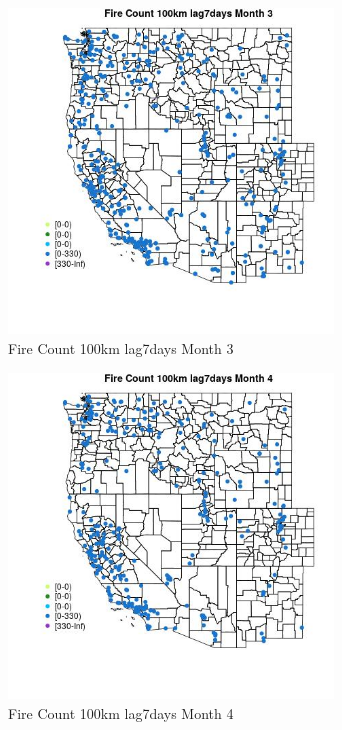 \begin{figure} 
\centering  
\includegraphics[width=0.77\textwidth]{Code_Outputs/Report_ML_input_PM25_Step4_part_e_de_duplicated_aves_compiled_2019-05-18wNAs_MapObsMo3Fire_Count_100km_lag7days.jpg} 
\caption{\label{fig:Report_ML_input_PM25_Step4_part_e_de_duplicated_aves_compiled_2019-05-18wNAsMapObsMo3Fire_Count_100km_lag7days}Fire Count 100km lag7days Month 3} 
\end{figure} 
 

\begin{figure} 
\centering  
\includegraphics[width=0.77\textwidth]{Code_Outputs/Report_ML_input_PM25_Step4_part_e_de_duplicated_aves_compiled_2019-05-18wNAs_MapObsMo4Fire_Count_100km_lag7days.jpg} 
\caption{\label{fig:Report_ML_input_PM25_Step4_part_e_de_duplicated_aves_compiled_2019-05-18wNAsMapObsMo4Fire_Count_100km_lag7days}Fire Count 100km lag7days Month 4} 
\end{figure} 
 

